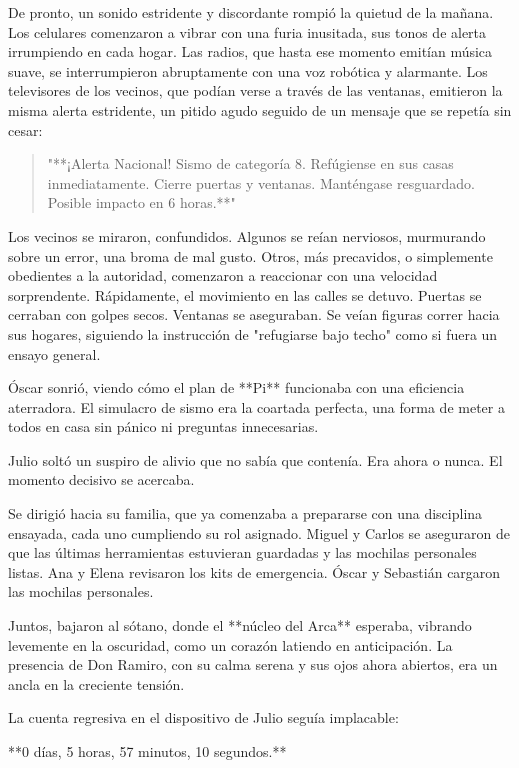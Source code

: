 \documentclass[a4paper,12pt]{book}
\begin{document}
De pronto, un sonido estridente y discordante rompió la quietud de la mañana. Los celulares comenzaron a vibrar con una furia inusitada, sus tonos de alerta irrumpiendo en cada hogar. Las radios, que hasta ese momento emitían música suave, se interrumpieron abruptamente con una voz robótica y alarmante. Los televisores de los vecinos, que podían verse a través de las ventanas, emitieron la misma alerta estridente, un pitido agudo seguido de un mensaje que se repetía sin cesar:

\begin{quote}
    "**¡Alerta Nacional! Sismo de categoría 8. Refúgiense en sus casas inmediatamente. Cierre puertas y ventanas. Manténgase resguardado. Posible impacto en 6 horas.**"
\end{quote}

Los vecinos se miraron, confundidos. Algunos se reían nerviosos, murmurando sobre un error, una broma de mal gusto. Otros, más precavidos, o simplemente obedientes a la autoridad, comenzaron a reaccionar con una velocidad sorprendente. Rápidamente, el movimiento en las calles se detuvo. Puertas se cerraban con golpes secos. Ventanas se aseguraban. Se veían figuras correr hacia sus hogares, siguiendo la instrucción de "refugiarse bajo techo" como si fuera un ensayo general.

Óscar sonrió, viendo cómo el plan de **Pi** funcionaba con una eficiencia aterradora. El simulacro de sismo era la coartada perfecta, una forma de meter a todos en casa sin pánico ni preguntas innecesarias.

Julio soltó un suspiro de alivio que no sabía que contenía. Era ahora o nunca. El momento decisivo se acercaba.

Se dirigió hacia su familia, que ya comenzaba a prepararse con una disciplina ensayada, cada uno cumpliendo su rol asignado. Miguel y Carlos se aseguraron de que las últimas herramientas estuvieran guardadas y las mochilas personales listas. Ana y Elena revisaron los kits de emergencia. Óscar y Sebastián cargaron las mochilas personales.

Juntos, bajaron al sótano, donde el **núcleo del Arca** esperaba, vibrando levemente en la oscuridad, como un corazón latiendo en anticipación. La presencia de Don Ramiro, con su calma serena y sus ojos ahora abiertos, era un ancla en la creciente tensión.

La cuenta regresiva en el dispositivo de Julio seguía implacable:

**0 días, 5 horas, 57 minutos, 10 segundos.**
\end{document}
